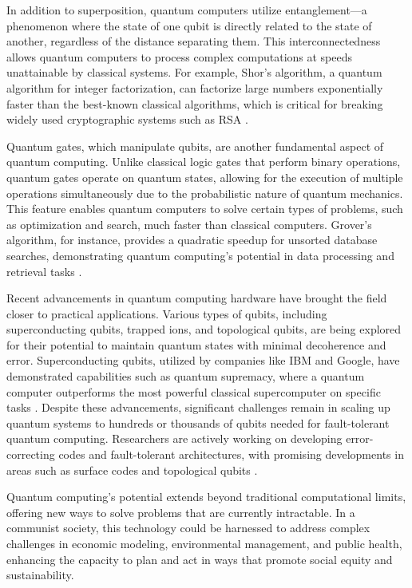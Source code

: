 In addition to superposition, quantum computers utilize entanglement—a phenomenon where the state of one qubit is directly related to the state of another, regardless of the distance separating them. This interconnectedness allows quantum computers to process complex computations at speeds unattainable by classical systems. For example, Shor's algorithm, a quantum algorithm for integer factorization, can factorize large numbers exponentially faster than the best-known classical algorithms, which is critical for breaking widely used cryptographic systems such as RSA \cite[pp.~10-15]{Shor1994}.

Quantum gates, which manipulate qubits, are another fundamental aspect of quantum computing. Unlike classical logic gates that perform binary operations, quantum gates operate on quantum states, allowing for the execution of multiple operations simultaneously due to the probabilistic nature of quantum mechanics. This feature enables quantum computers to solve certain types of problems, such as optimization and search, much faster than classical computers. Grover's algorithm, for instance, provides a quadratic speedup for unsorted database searches, demonstrating quantum computing's potential in data processing and retrieval tasks \cite[pp.~121-126]{Grover1996}.

Recent advancements in quantum computing hardware have brought the field closer to practical applications. Various types of qubits, including superconducting qubits, trapped ions, and topological qubits, are being explored for their potential to maintain quantum states with minimal decoherence and error. Superconducting qubits, utilized by companies like IBM and Google, have demonstrated capabilities such as quantum supremacy, where a quantum computer outperforms the most powerful classical supercomputer on specific tasks \cite[pp.~50-53]{Arute2019}. Despite these advancements, significant challenges remain in scaling up quantum systems to hundreds or thousands of qubits needed for fault-tolerant quantum computing. Researchers are actively working on developing error-correcting codes and fault-tolerant architectures, with promising developments in areas such as surface codes and topological qubits \cite[pp.~115-120]{Kitaev2003}.

Quantum computing's potential extends beyond traditional computational limits, offering new ways to solve problems that are currently intractable. In a communist society, this technology could be harnessed to address complex challenges in economic modeling, environmental management, and public health, enhancing the capacity to plan and act in ways that promote social equity and sustainability.

